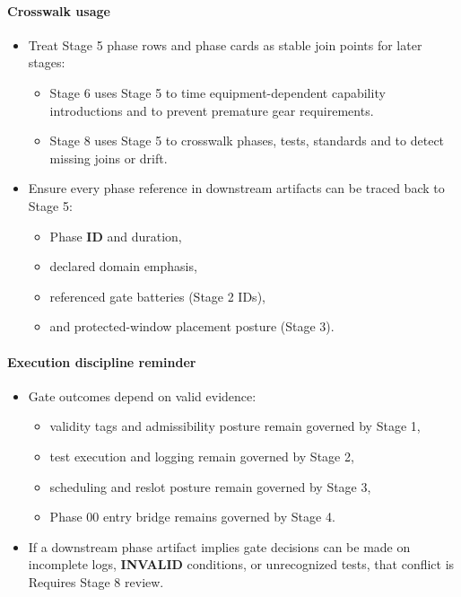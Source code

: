 \documentclass[10pt]{article}
\begin{document}
\paragraph*{Crosswalk usage}

\begin{itemize}
\item Treat Stage 5 phase rows and phase cards as stable join points for later stages:
  \begin{itemize}
  \item Stage 6 uses Stage 5 to time equipment-dependent capability introductions and to prevent premature gear requirements.
  \item Stage 8 uses Stage 5 to crosswalk phases, tests, standards and to detect missing joins or drift.
  \end{itemize}
\item Ensure every phase reference in downstream artifacts can be traced back to Stage 5:
  \begin{itemize}
  \item Phase \textbf{ID} and duration,
  \item declared domain emphasis,
  \item referenced gate batteries (Stage 2 IDs),
  \item and protected-window placement posture (Stage 3).
  \end{itemize}
\end{itemize}

\paragraph*{Execution discipline reminder}

\begin{itemize}
\item Gate outcomes depend on valid evidence:
  \begin{itemize}
  \item validity tags and admissibility posture remain governed by Stage 1,
  \item test execution and logging remain governed by Stage 2,
  \item scheduling and reslot posture remain governed by Stage 3,
  \item Phase 00 entry bridge remains governed by Stage 4.
  \end{itemize}
\item If a downstream phase artifact implies gate decisions can be made on incomplete logs, \textbf{INVALID} conditions, or unrecognized tests, that conflict is Requires Stage 8 review.
\end{itemize}
\end{document}
